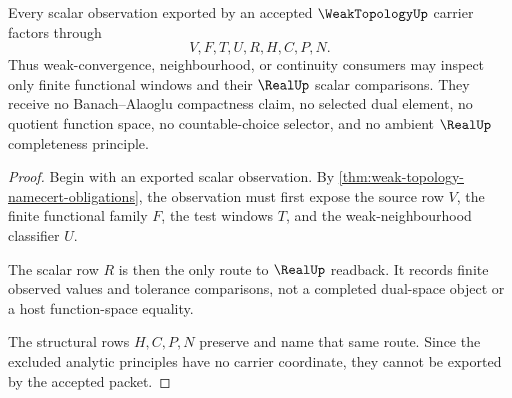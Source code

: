 \begin{theorem}
\label{thm:weak-topology-scalar-observation-nonescape}
Every scalar observation exported by an accepted $\WeakTopologyUp$ carrier factors through
$$
V,F,T,U,R,H,C,P,N .
$$
Thus weak-convergence, neighbourhood, or continuity consumers may inspect only finite functional windows and their $\RealUp$ scalar comparisons. They receive no Banach--Alaoglu compactness claim, no selected dual element, no quotient function space, no countable-choice selector, and no ambient $\RealUp$ completeness principle.
\end{theorem}
\begin{proof}
Begin with an exported scalar observation. By \autoref{thm:weak-topology-namecert-obligations}, the observation must first expose the source row $V$, the finite functional family $F$, the test windows $T$, and the weak-neighbourhood classifier $U$.

The scalar row $R$ is then the only route to $\RealUp$ readback. It records finite observed values and tolerance comparisons, not a completed dual-space object or a host function-space equality.

The structural rows $H,C,P,N$ preserve and name that same route. Since the excluded analytic principles have no carrier coordinate, they cannot be exported by the accepted packet.
\end{proof}




